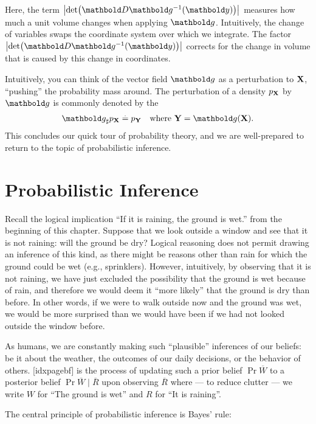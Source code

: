 Here, the term $\abs{\det{\jac \inv{\vg}(\vy)}}$ measures how much a unit volume changes when applying $\vg$.
Intuitively, the change of variables swaps the coordinate system over which we integrate.
The factor $\abs{\det{\jac \inv{\vg}(\vy)}}$ corrects for the change in volume that is caused by this change in coordinates.

Intuitively, you can think of the vector field $\vg$ as a perturbation to $\mathbf{X}$, ``pushing'' the probability mass around.
The perturbation of a density $p_{\mathbf{X}}$ by $\vg$ is commonly denoted by the  \begin{align}
  \pf{\vg}{p_\rX} \defeq p_\rY \quad\text{where $\rY = \vg(\rX)$}.
\end{align}
This concludes our quick tour of probability theory, and we are well-prepared to return to the topic of probabilistic inference.

\section{Probabilistic Inference}

Recall the logical implication ``If it is raining, the ground is wet.'' from the beginning of this chapter.
Suppose that we look outside a window and see that it is not raining: will the ground be dry?
Logical reasoning does not permit drawing an inference of this kind, as there might be reasons other than rain for which the ground could be wet (e.g., sprinklers).
However, intuitively, by observing that it is not raining, we have just excluded the possibility that the ground is wet because of rain, and therefore we would deem it ``more likely'' that the ground is dry than before.
In other words, if we were to walk outside now and the ground was wet, we would be more surprised than we would have been if we had not looked outside the window before.

As humans, we are constantly making such ``plausible'' inferences of our beliefs: be it about the weather, the outcomes of our daily decisions, or the behavior of others.
[idxpagebf] is the process of updating such a prior belief $\Pr{\overline{W}}$ to a posterior belief $\Pr{\overline{W} \mid \overline{R}}$ upon observing $\overline{R}$ where --- to reduce clutter --- we write $W$ for ``The ground is wet'' and $R$ for ``It is raining''.

The central principle of probabilistic inference is Bayes' rule:

